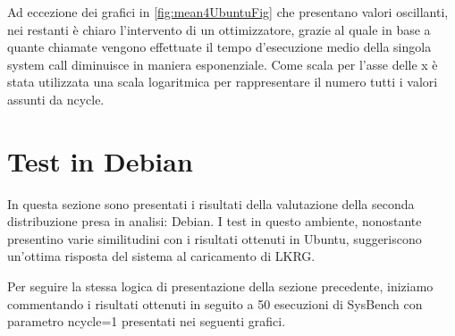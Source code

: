 Ad eccezione dei grafici in \autoref{fig:mean4UbuntuFig} che presentano valori oscillanti, nei restanti è chiaro l'intervento di un ottimizzatore, grazie al quale in base a quante chiamate vengono effettuate il tempo d'esecuzione medio della singola system call diminuisce in maniera esponenziale. Come scala per l'asse delle x è stata utilizzata una scala logaritmica per rappresentare il numero tutti i valori assunti da ncycle.

\section{Test in Debian}

In questa sezione sono presentati i risultati della valutazione della seconda distribuzione presa in analisi: Debian. I test in questo ambiente, nonostante presentino varie similitudini con i risultati ottenuti in Ubuntu, suggeriscono un'ottima risposta del sistema al caricamento di LKRG.

Per seguire la stessa logica di presentazione della sezione precedente, iniziamo commentando i risultati ottenuti in seguito a 50 esecuzioni di SysBench con parametro ncycle=1 presentati nei seguenti grafici.

